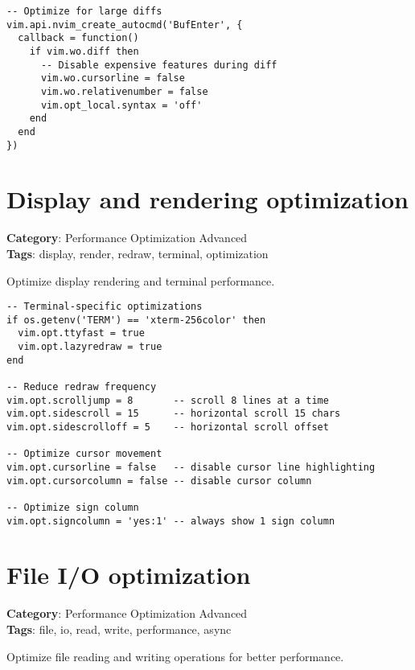 {{{{{{{{{{\begin{Exa*}{}
\begin{Verbatim}[fontsize=\footnotesize, breaklines, breakanywhere]
-- Optimize for large diffs
vim.api.nvim_create_autocmd('BufEnter', {
  callback = function()
    if vim.wo.diff then
      -- Disable expensive features during diff
      vim.wo.cursorline = false
      vim.wo.relativenumber = false
      vim.opt_local.syntax = 'off'
    end
  end
})
\end{Verbatim}
\end{Exa*}

\section{Display and rendering optimization}

\textbf{Category}: Performance Optimization Advanced\\ \textbf{Tags}: display, render, redraw, terminal, optimization
\vspace{0.5cm}

Optimize display rendering and terminal performance.

\begin{Exa*}{}
\begin{Verbatim}[fontsize=\footnotesize, breaklines, breakanywhere]
-- Terminal-specific optimizations
if os.getenv('TERM') == 'xterm-256color' then
  vim.opt.ttyfast = true
  vim.opt.lazyredraw = true
end

-- Reduce redraw frequency
vim.opt.scrolljump = 8       -- scroll 8 lines at a time
vim.opt.sidescroll = 15      -- horizontal scroll 15 chars
vim.opt.sidescrolloff = 5    -- horizontal scroll offset

-- Optimize cursor movement
vim.opt.cursorline = false   -- disable cursor line highlighting
vim.opt.cursorcolumn = false -- disable cursor column

-- Optimize sign column
vim.opt.signcolumn = 'yes:1' -- always show 1 sign column
\end{Verbatim}
\end{Exa*}

\section{File I/O optimization}

\textbf{Category}: Performance Optimization Advanced\\ \textbf{Tags}: file, io, read, write, performance, async
\vspace{0.5cm}

Optimize file reading and writing operations for better performance.

}}}}}}}}}}
